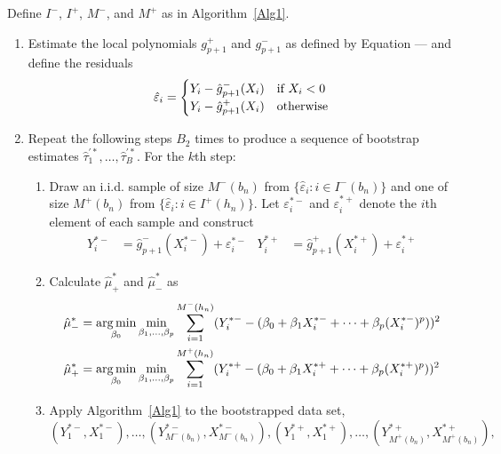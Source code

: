 \documentclass[12pt,fleqn]{article}
\begin{document}
\begin{algorithm}\label{Alg2}
  Define $I^-$, $I^+$, $M^-$, and $M^+$ as in Algorithm~\ref{Alg1}.
  \begin{enumerate}
  \item Estimate the local polynomials $g_{p+1}^+$ and $g_{p+1}^-$ as defined by
    Equation --- and define the residuals
    \begin{equation}
      \label{eq:3}
      \hat\varepsilon_i =
      \begin{cases}
        Y_i - \hat g_{p+1}^-(X_i) & \text{if}\ X_i < 0 \\
        Y_i - \hat g_{p+1}^+(X_i) & \text{otherwise}
      \end{cases}
    \end{equation}
  \item Repeat the following steps $B_2$ times to produce a sequence of bootstrap
    estimates $\hat\tau_1^{\prime*},\dots,\hat\tau_B^{\prime*}$. For the $k$th step:
    \begin{enumerate}
    \item Draw an i.i.d. sample of size $M^-(b_n)$ from
      $\{\hat\varepsilon_i : i \in I^-(b_n)\}$ and one of size $M^+(b_n)$ from
      $\{\hat\varepsilon_i : i \in I^+(h_n)\}$. Let $\varepsilon_i^{*-}$ and
      $\varepsilon_i^{*+}$ denote the $i$th element of each sample and construct
      \begin{align}
        Y_i^{*-} &= \hat g_{p+1}^-(X_i^{*-}) + \varepsilon_i^{*-} &
        Y_i^{*+} &= \hat g_{p+1}^+(X_i^{*+}) + \varepsilon_i^{*+}
      \end{align}
    \item Calculate $\hat\mu_+^*$ and $\hat\mu_-^*$ as
      \begin{align}
        \hat\mu_-^*
        &= \operatorname*{arg\,min}_{\beta_0} \min_{\beta_1,\dots,\beta_p}
          \sum_{i = 1}^{M^-(h_n)} (Y_i^{*-} -
          (\beta_0 + \beta_1 X_i^{*-} + \cdots + \beta_p (X_i^{*-})^p))^2 \\
        \hat\mu_+^*
        &= \operatorname*{arg\,min}_{\beta_0} \min_{\beta_1,\dots,\beta_p}
          \sum_{i = 1}^{M^+(h_n)} (Y_i^{*+} -
          (\beta_0 + \beta_1 X_i^{*+} + \cdots + \beta_p (X_i^{*+})^p))^2
      \end{align}
    \item Apply Algorithm~\ref{Alg1} to the bootstrapped data set,
      \begin{equation*}
        (Y_1^{*-}, X_1^{*-}),\dots,(Y_{M^-(b_n)}^{*-},X_{M^-(b_n)}^{*-}),
        (Y_1^{*+}, X_1^{*+}),\dots,(Y_{M^+(b_n)}^{*+},X_{M^+(b_n)}^{*+}),

\end{equation*}
\end{enumerate}
\end{enumerate}
\end{algorithm}
\end{document}
